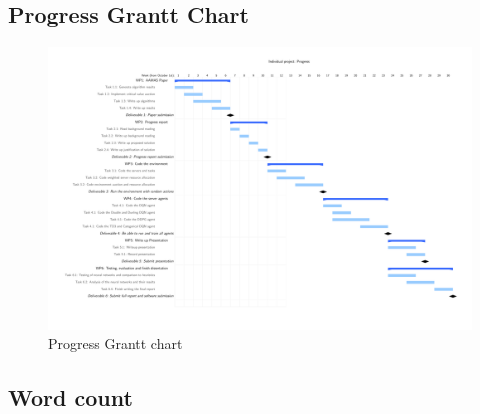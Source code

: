 \subsection*{Progress Grantt Chart}
\begin{figure}[H]
    \centering
    \includegraphics[width=\linewidth]{extra/progress_grantt_chart.pdf}
    \caption{Progress Grantt chart}
    \label{fig:progress_grant_chart}
\end{figure}



\subsection*{Word count}
\wordcount
